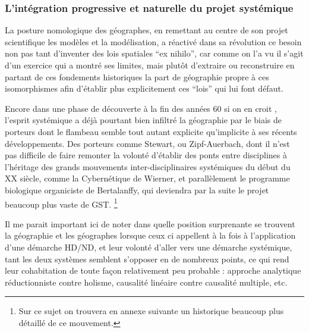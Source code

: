 
\subsubsection{L'intégration progressive et naturelle du projet systémique} 
\label{sssec:progressive_systemique}

La posture nomologique des géographes, en remettant au centre de son projet scientifique les modèles et la modélisation, a réactivé dans sa révolution ce besoin non pas tant d'inventer des lois spatiales \foreignquote{latin}{ex nihilo}, car comme on l'a vu il s'agit d'un exercice qui a montré ses limites, mais plutôt d'extraire ou reconstruire en partant de ces fondements historiques la part de géographie propre à ces isomorphismes afin d'établir plus explicitement ces \enquote{lois} qui lui font défaut.

Encore dans une phase de découverte à la fin des années 60 si on en croit \textcite{Harvey1969}, l'esprit systémique \textcite{Ackerman1963} a déjà pourtant bien infiltré la géographie par le biais de porteurs dont le flambeau semble tout autant explicite qu'implicite à ses récents développements. Des porteurs comme Stewart, ou Zipf-Auerbach, dont il n'est pas difficile de faire remonter la volonté d'établir des ponts entre disciplines à l'héritage des grands mouvements inter-disciplinaires systémiques du début du XX siècle, comme la Cybernétique de Wierner, et parallèlement le programme biologique organiciste de Bertalanffy, qui deviendra par la suite le projet beaucoup plus vaste de GST. \footnote{Sur ce sujet on trouvera en annexe suivante un historique beaucoup plus détaillé de ce mouvement.} 

Il me parait important ici de noter dans quelle position surprenante se trouvent la géographie et les géographes lorsque ceux ci appellent à la fois à l'application d'une démarche HD/ND, et leur volonté d'aller vers une démarche systémique, tant les deux systèmes semblent s'opposer en de nombreux points, ce qui rend leur cohabitation de toute façon relativement peu probable : approche analytique réductionniste contre holisme, causalité linéaire contre causalité multiple, etc. 


